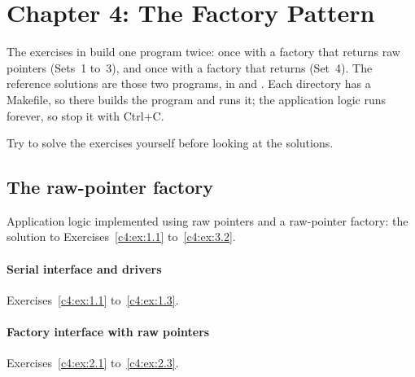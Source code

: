 
\section{Chapter 4: The Factory Pattern}
\label{sol:sec:c4}
The exercises in  build one program twice: once with a factory that
returns raw pointers (Sets~1 to~3), and once with a factory that returns 
(Set~4). The reference solutions are those two programs, in
 and
. Each directory has a Makefile, so
 there builds the program and runs it; the application logic runs forever, so stop it
with Ctrl+C.

\note Try to solve the exercises yourself before looking at the solutions.

\subsection{The raw-pointer factory}
\label{sol:set:c4.1}\label{sol:set:c4.2}\label{sol:set:c4.3}
Application logic implemented using raw pointers and a raw-pointer factory: the solution to
Exercises~\ref{c4:ex:1.1} to~\ref{c4:ex:3.2}.

\paragraph{Serial interface and drivers}
Exercises~\ref{c4:ex:1.1} to~\ref{c4:ex:1.3}.


\paragraph{Factory interface with raw pointers}
Exercises~\ref{c4:ex:2.1} to~\ref{c4:ex:2.3}.


